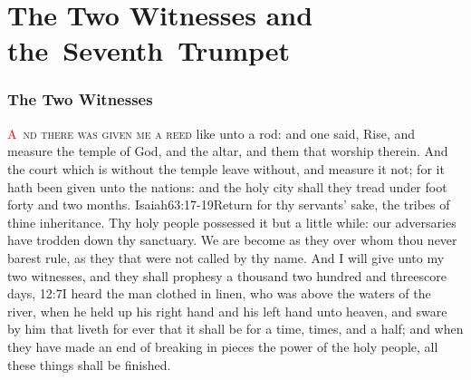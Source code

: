 
\chapter{The Two Witnesses and \linebreak[0] \mbox{the Seventh Trumpet}}
\fancyhead{} %
\subsection*{The Two Witnesses}
\lettrine[lines=3,slope=0.5em]{\textcolor{red}{A}}{\ nd there was given me a reed} like unto a rod:%
and one said, Rise, and measure the temple of God, and the altar, and them that worship therein. 
And the court which is without the temple leave without, and measure it not; for it hath been given unto the nations: and the holy city shall they tread under foot forty and two months.%
					{Isaiah}{63:17-19}{Return for thy servants’ sake, the tribes of thine inheritance. Thy holy people possessed it but a little while: our adversaries have trodden down thy sanctuary. We are become as they over whom thou never barest rule, as they that were not called by thy name.} %
And I will give unto my two witnesses, and they shall prophesy a thousand two hundred and threescore days,%
					{12:7}{I heard the man clothed in linen, who was above the waters of the river, when he held up his right hand and his left hand unto heaven, and sware by him that liveth for ever that it shall be for a time, times, and a half; and when they have made an end of breaking in pieces the power of the holy people, all these things shall be finished.} %
